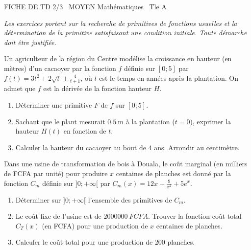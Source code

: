 \documentclass[11pt]{article}
\begin{document}
\begin{tcolorbox}[enhanced,colback=popink,colframe=popink,arc=10pt,boxrule=0pt,left=12pt,right=12pt,top=9pt,bottom=9pt]
{\color{white}\popxbold\small FICHE DE TD 2/3 \textbullet\ MOYEN \hfill Mathématiques \textbullet\ Tle A\par}
\end{tcolorbox}
\vspace{4pt}
\emph{Les exercices portent sur la recherche de primitives de fonctions usuelles et la détermination de la primitive satisfaisant une condition initiale. Toute démarche doit être justifiée.}

\begin{exercice}
Un agriculteur de la région du Centre modélise la croissance en hauteur (en mètres) d'un cacaoyer par la fonction $f$ définie sur $[0; 5]$ par $f(t) = 3t^2 + 2\sqrt{t} + \frac{4}{t+1}$, où $t$ est le temps en années après la plantation. On admet que $f$ est la dérivée de la fonction hauteur $H$.
\begin{enumerate}
    \item Déterminer une primitive $F$ de $f$ sur $[0; 5]$.
    \item Sachant que le plant mesurait $\SI{0.5}{\meter}$ à la plantation ($t=0$), exprimer la hauteur $H(t)$ en fonction de $t$.
    \item Calculer la hauteur du cacaoyer au bout de $4$ ans. Arrondir au centimètre.
\end{enumerate}
\end{exercice}

\begin{exercice}
Dans une usine de transformation de bois à Douala, le coût marginal (en milliers de FCFA par unité) pour produire $x$ centaines de planches est donné par la fonction $C_m$ définie sur $]0; +\infty[$ par $C_m(x) = 12x - \frac{9}{x^2} + 5e^{x}$.
\begin{enumerate}
    \item Déterminer sur $]0; +\infty[$ l'ensemble des primitives de $C_m$.
    \item Le coût fixe de l'usine est de $\SI{2000000}{FCFA}$. Trouver la fonction coût total $C_T(x)$ (en FCFA) pour une production de $x$ centaines de planches.
    \item Calculer le coût total pour une production de $200$ planches.
\end{enumerate}
\end{exercice}
\end{document}
